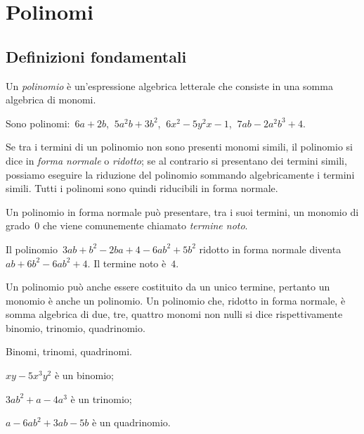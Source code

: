 
\chapter{Polinomi}
\section{Definizioni fondamentali}

\begin{definizione}
Un \emph{polinomio} è un'espressione algebrica letterale che consiste in una somma algebrica di monomi.
\end{definizione}

\begin{exrig}
\begin{esempio}
Sono polinomi:~$6a+2b$, $\:5a^2b+3b^2$, $\:6x^2-5y^2x-1$, $\:7ab-2a^2b^3+4$.
\end{esempio}
\end{exrig}

Se tra i termini di un polinomio non sono presenti monomi simili, il polinomio si dice in \emph{forma normale} o
\emph{ridotto}; se al contrario si presentano dei termini simili, possiamo eseguire la riduzione del polinomio
sommando algebricamente i termini simili. Tutti i polinomi sono quindi riducibili in forma normale.

Un polinomio in forma normale può presentare, tra i suoi termini, un monomio di grado~0 che viene
comunemente chiamato \emph{termine noto}.

\begin{exrig}
\begin{esempio}
Il polinomio~$3ab+b^2−2ba+4−6ab^2+5b^2$ ridotto in forma normale diventa~$ab+6b^2−6ab^2+4$. Il termine noto è~$4$.
\end{esempio}
\end{exrig}

\ovalbox{\risolvi\ref{ese:11.1}}\vspazio

Un polinomio può anche essere costituito da un unico termine, pertanto un monomio è anche un polinomio.
Un polinomio che, ridotto in forma normale, è somma algebrica di due, tre, quattro monomi non nulli si dice
rispettivamente binomio, trinomio, quadrinomio.

\begin{exrig}
\begin{esempio}
Binomi, trinomi, quadrinomi.
\begin{enumeratea}
\item $xy−5x^3y^2$ è un binomio;
\item $3ab^2 +a−4a^3$ è un trinomio;
\item $a−6ab^2+3ab−5b$ è un quadrinomio.
\end{enumeratea}
\end{esempio}
\end{exrig}

